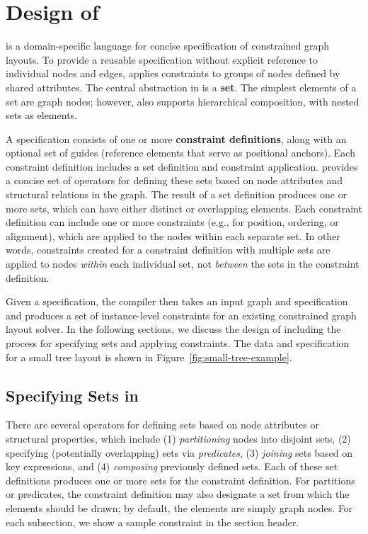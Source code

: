 \section{Design of \projectname}
\projectname is a domain-specific language for concise specification of 
constrained graph layouts. To provide a reusable specification 
without explicit reference to individual nodes and edges, \projectname
applies constraints to groups of nodes defined by shared attributes. 
The central abstraction in \projectname is a \textbf{set}. The 
simplest elements of a set are graph nodes; however, \projectname also
supports hierarchical composition, with nested sets as elements.

A \projectname specification consists of one or more \textbf{constraint definitions},
along with an optional set of guides (reference elements that serve as 
positional anchors).  Each constraint definition
includes a set definition and constraint application.
\projectname provides a concise set of operators for defining
these sets based on node attributes and structural relations in the graph.
The result of a set definition produces one or more sets, which 
can have either distinct or overlapping elements. Each constraint definition can 
include one or more constraints (e.g., for position, ordering, 
or alignment), which are applied to the nodes within each separate set. 
In other words, constraints created for a constraint definition with multiple sets are 
applied to nodes \emph{within} each individual set, not \emph{between} 
the sets in the constraint definition.

Given a \projectname specification,
the \projectname compiler then takes an input graph 
and specification and produces a set of instance-level constraints for 
an existing constrained graph layout solver. In the following sections, 
we discuss the design of \projectname including the process for 
specifying sets and applying constraints. The data and \projectname 
specification for a small tree layout is shown in Figure~\ref{fig:small-tree-example}.

\smallTreeExample

\subsection{Specifying Sets in \projectname}
There are several operators for defining sets based on node attributes 
or structural properties, which include (1) \emph{partitioning} nodes 
into disjoint sets, (2) specifying (potentially overlapping) sets via
\emph{predicates}, (3) \emph{joining} sets based on key expressions,
and (4) \emph{composing} previously defined sets. Each of these set
definitions produces one or more sets for the constraint definition. For
partitions or predicates, the constraint definition may also 
designate a set from which the elements should be drawn; by default, the
elements are simply graph nodes. For each subsection, we show a sample
\projectname constraint in the section header.


